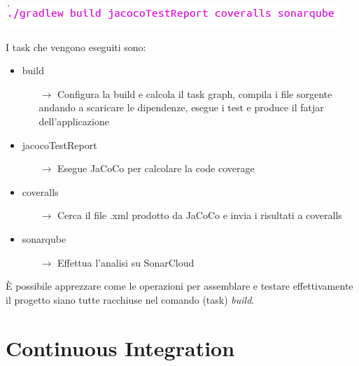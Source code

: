\begin{minipage}{\linewidth}
	\includegraphics[width=\textwidth]{img/gradle-build.png}
\end{minipage}
\newline\newline
I task che vengono eseguiti sono:
\begin{itemize}
	\item build
	\begin{itemize}
		\item[$\rightarrow$] Configura la build e calcola il task graph, compila i file sorgente andando a scaricare le dipendenze, esegue i test e produce il fatjar dell'applicazione
	\end{itemize}
	\item jacocoTestReport
	\begin{itemize}
		\item[$\rightarrow$] Esegue JaCoCo per calcolare la code coverage
	\end{itemize}
	\item coveralls
	\begin{itemize}
		\item[$\rightarrow$] Cerca il file .xml prodotto da JaCoCo e invia i risultati a coveralls
	\end{itemize}
	\item sonarqube
	\begin{itemize}
		\item[$\rightarrow$] Effettua l'analisi su SonarCloud
	\end{itemize}
\end{itemize}
È possibile apprezzare come le operazioni per assemblare e testare effettivamente il progetto siano tutte racchiuse nel comando (task) \textsl{build}.

\section{Continuous Integration}

